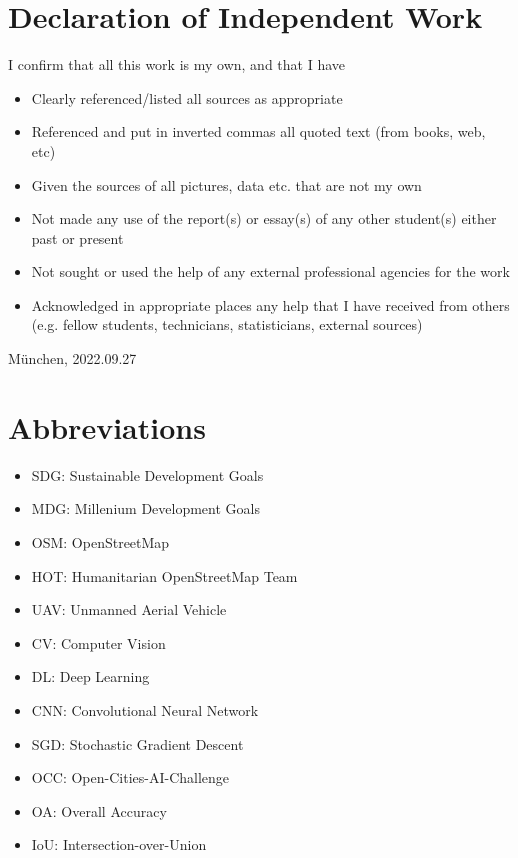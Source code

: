 \documentclass[11pt, a4paper, twoside]{report}
\begin{document}
\newpage
\section{Declaration of Independent Work}

I confirm that all this work is my own, and that I have
\begin{itemize}
  \item Clearly referenced/listed all sources as appropriate
  \item Referenced and put in inverted commas all quoted text (from books, web, etc)
  \item Given the sources of all pictures, data etc. that are not my own
  \item Not made any use of the report(s) or essay(s) of any other student(s) either past or present
  \item Not sought or used the help of any external professional agencies for the work
  \item Acknowledged in appropriate places any help that I have received from others (e.g. fellow students, technicians, statisticians, external sources)
\end{itemize}

\vspace{5cm}

München, 2022.09.27

\newpage


\tableofcontents

\newpage

\listoffigures

\newpage

\listoftables
\clearpage

\newpage
\pagestyle{plain}
\section{Abbreviations}

\begin{itemize}
  \item SDG: Sustainable Development Goals
  \item MDG: Millenium Development Goals
  \item OSM: OpenStreetMap
  \item HOT: Humanitarian OpenStreetMap Team
  \item UAV: Unmanned Aerial Vehicle
  \item CV: Computer Vision
  \item DL: Deep Learning
  \item CNN: Convolutional Neural Network
  \item SGD: Stochastic Gradient Descent
  \item OCC: Open-Cities-AI-Challenge
  \item OA: Overall Accuracy
  \item IoU: Intersection-over-Union
\end{itemize}
\end{document}
